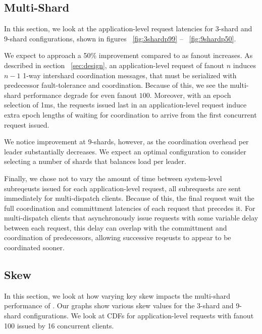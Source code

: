 \subsection{Multi-Shard}
\label{sec:shards}
In this section, we look at the application-level request latencies for 3-shard and 9-shard configurations, shown in figures ~\ref{fig:3shardp99} -- ~\ref{fig:9shardp50}.

We expect \system to approach a 50\% improvement compared to \mpaxos as fanout increases.
As described in section ~\ref{sec:design}, an application-level request of fanout $n$ induces $n-1$ 1-way intershard coordination messages, that must be serialized with predecessor fault-tolerance and coordination.
Because of this, we see the multi-shard performance degrade for even fanout $100$. 
Moreover, with an epoch selection of 1ms, the requests issued last in an application-level request induce extra epoch lengths of waiting for coordination to arrive from the first concurrent request issued.

We notice improvement at 9-shards, however, as the coordination overhead per leader substantially decreases. We expect an optimal configuration to consider selecting a number of shards that balances load per leader.

Finally, we chose not to vary the amount of time between system-level subreqeusts issued for each application-level request, all subrequests are sent immediately for multi-dispatch clients. Because of this, the final request wait the full coordination and committment latencies of each request that precedes it. For multi-dispatch clients that asynchronously issue requests with some variable delay between each request, this delay can overlap with the committment and coordination of predecessors, allowing successive reqeusts to appear to be coordinated sooner.

\subsection{Skew}
In this section, we look at how varying key skew impacts the multi-shard performance of \system.
Our graphs show various skew values for the 3-shard and 9-shard configurations. We look at CDFs for application-level requests with fanout 100 issued by 16 concurrent clients. 

